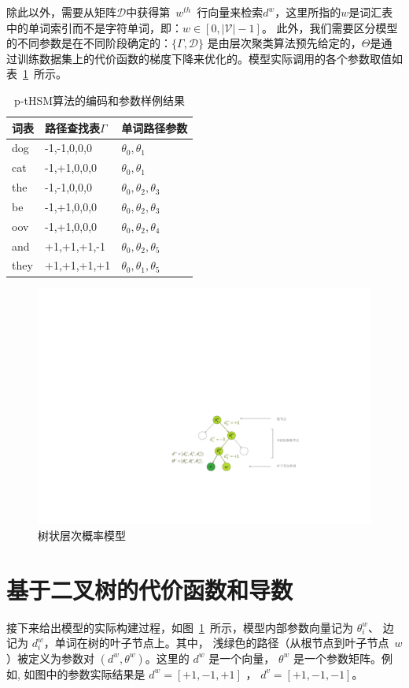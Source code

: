 除此以外，需要从矩阵$\mathcal{D}$中获得第~$w^{th}$~行向量来检索$d^w$，这里所指的$w$是词汇表中的单词索引而不是字符单词，即：$w\in [0,\mathcal{|V|}-1]$。 此外，我们需要区分模型的不同参数是在不同阶段确定的：$\{\Gamma,\mathcal{D}\}$ 是由层次聚类算法预先给定的，$\Theta$是通过训练数据集上的代价函数的梯度下降来优化的。模型实际调用的各个参数取值如表~\ref{tab:example}~所示。

\begin{table}[!h]
  \centering
  \caption{p-tHSM算法的编码和参数样例结果}\label{tab:example}
\begin{tabular}{lll}
  \toprule
  词表&路径查找表$\Gamma$& 单词路径参数\\ \midrule
dog & -1,-1,0,0,0& $\theta_0,\theta_1$\\
cat & -1,+1,0,0,0&$\theta_0,\theta_1$\\
the & -1,-1,0,0,0& $\theta_0,\theta_2,\theta_3$\\
be & -1,+1,0,0,0&$\theta_0,\theta_2,\theta_3$\\
oov & -1,+1,0,0,0&$\theta_0,\theta_2,\theta_4$\\
and & +1,+1,+1,-1& $\theta_0,\theta_2,\theta_5$\\
they & +1,+1,+1,+1&$\theta_0,\theta_1,\theta_5$\\
  \bottomrule
\end{tabular}
\end{table}

\begin{figure}[!h]
  \centering
    \includegraphics[width=0.93\linewidth]{./figures/thsm.pdf}
\caption{树状层次概率模型}\label{fig:tree_hsm} %
\end{figure}

\section{基于二叉树的代价函数和导数}
接下来给出模型的实际构建过程，如图~\ref{fig:tree_hsm}~所示，模型内部参数向量记为 $\theta_i^w$、 边记为 $d_i^w$，单词在树的叶子节点上。其中， 浅绿色的路径（从根节点到叶子节点~$w$）被定义为参数对 $(d^w,\theta^w)$。这里的 $d^w$ 是一个向量， $\theta^w$ 是一个参数矩阵。例如, 如图中的参数实际结果是 $d^w=[+1,-1,+1]$ ， $d^{v}=[+1,-1,-1]$。

